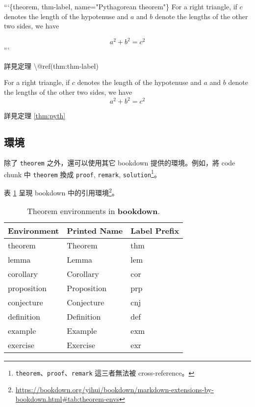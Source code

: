 \documentclass[oneside]{book}
\newenvironment{Shaded}{\begin{snugshade}}{\end{snugshade}}
\newcommand{\BaseNTok}[1]{\textcolor[rgb]{0.00,0.00,0.81}{#1}}
\newcommand{\NormalTok}[1]{#1}
\renewcommand{\href}[2]{#2\footnote{\url{#1}}}
\theoremstyle{definition}
\theoremstyle{definition}
\theoremstyle{definition}
\theoremstyle{remark}
\let\BeginKnitrBlock\begin \let\EndKnitrBlock\end
\begin{document}
\begin{Shaded}
\begin{Highlighting}[]
\BaseNTok{```\{theorem, thm-label, name="Pythagorean theorem"\}}
\BaseNTok{For a right triangle, if $c$ denotes the length of the hypotenuse}
\BaseNTok{and $a$ and $b$ denote the lengths of the other two sides, we have}

\BaseNTok{$$a^2 + b^2 = c^2$$}
\BaseNTok{```}

\NormalTok{詳見定理 \textbackslash{}@ref(thm:thm-label)}
\end{Highlighting}
\end{Shaded}

\BeginKnitrBlock{theorem}[Pythagorean theorem]
\protect\hypertarget{thm:pyth}{}{\label{thm:pyth} \iffalse (Pythagorean theorem) \fi{} }For a right triangle, if \(c\) denotes the length of the hypotenuse
and \(a\) and \(b\) denote the lengths of the other two sides, we have
\[a^2 + b^2 = c^2\]
\EndKnitrBlock{theorem}

詳見定理 \ref{thm:pyth}

\hypertarget{environment}{%
\subsection{環境}\label{environment}}

除了 \texttt{theorem} 之外，還可以使用其它 bookdown 提供的環境。例如，將 code chunk 中 \texttt{theorem} 換成 \texttt{proof}, \texttt{remark}, \texttt{solution}\footnote{\texttt{theorem}、\texttt{proof}、\texttt{remark} 這三者無法被 cross-reference。}。

表 \ref{tab:theorem-envs} 呈現 bookdown 中的\href{https://bookdown.org/yihui/bookdown/markdown-extensions-by-bookdown.html\#tab:theorem-envs}{引用環境}。



\begin{table}

\caption{\label{tab:theorem-envs}Theorem environments in \textbf{bookdown}.}
\centering
\begin{tabular}[t]{lll}
\toprule
Environment & Printed Name & Label Prefix\\
\midrule
theorem & Theorem & thm\\
lemma & Lemma & lem\\
corollary & Corollary & cor\\
proposition & Proposition & prp\\
conjecture & Conjecture & cnj\\
\addlinespace
definition & Definition & def\\
example & Example & exm\\
exercise & Exercise & exr\\
\bottomrule
\end{tabular}
\end{table}
\end{document}

